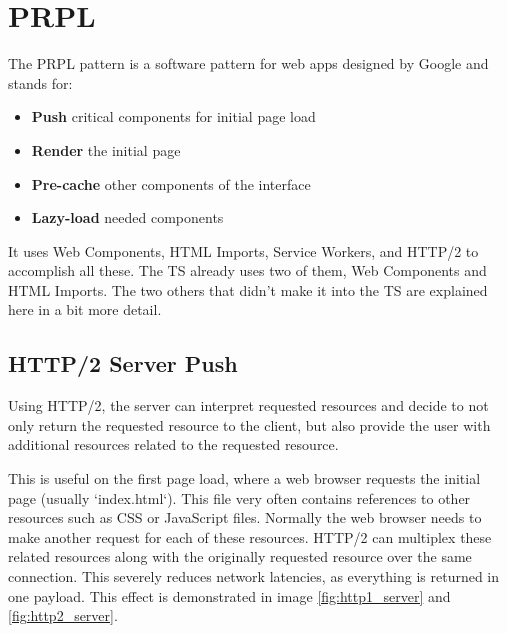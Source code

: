 \section{PRPL}
The PRPL\cite{PRPL} pattern is a software pattern for web apps designed by Google and stands for:
\begin{itemize}[noitemsep]
\item \textbf{Push} critical components for initial page load
\item \textbf{Render} the initial page
\item \textbf{Pre-cache} other components of the interface
\item \textbf{Lazy-load} needed components
\end{itemize}

It uses Web Components, HTML Imports, Service Workers, and HTTP/2 to accomplish
all these. The TS already uses two of them, Web Components and HTML Imports.
The two others that didn't make it into the TS are explained here in a bit more
detail.

\subsection{HTTP/2 Server Push}
Using HTTP/2, the server can interpret requested resources and decide to not only
return the requested resource to the client, but also provide the user with
additional resources related to the requested resource.

This is useful on the first page load, where a web browser requests the initial
page (usually `index.html`). This file very often contains references to other
resources such as CSS or JavaScript files.
Normally the web browser needs to make another request for each of these
resources.
HTTP/2 can multiplex these related resources along with the originally requested
resource over the same connection.
This severely reduces network latencies, as everything is returned
in one payload.
This effect is demonstrated in image \ref{fig:http1_server} and \ref{fig:http2_server}.

